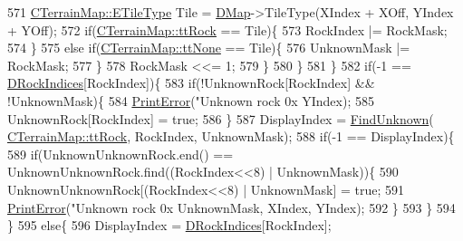 \begin{DoxyCode}
{{{{{{571                                 \hyperlink{classCTerrainMap_aff2ab991e237269941416dd79d8871d4}{CTerrainMap::ETileType} Tile = 
      \hyperlink{classCMapRenderer_ab9a199c61aa1c87a3248af3085d8ba52}{DMap}->TileType(XIndex + XOff, YIndex + YOff);
572                                 \textcolor{keywordflow}{if}(\hyperlink{classCTerrainMap_aff2ab991e237269941416dd79d8871d4a215740f194a2d72a21d47c848fbfecad}{CTerrainMap::ttRock} == Tile)\{
573                                     RockIndex |= RockMask;   
574                                 \}
575                                 \textcolor{keywordflow}{else} \textcolor{keywordflow}{if}(\hyperlink{classCTerrainMap_aff2ab991e237269941416dd79d8871d4a481e779132fb16414d17870bd6229eb5}{CTerrainMap::ttNone} == Tile)\{
576                                     UnknownMask |= RockMask;
577                                 \}
578                                 RockMask <<= 1;
579                             \}
580                         \}
581                     \}
582                     \textcolor{keywordflow}{if}(-1 == \hyperlink{classCMapRenderer_ac9178a9c9d30ac44aed7d324c51164a4}{DRockIndices}[RockIndex])\{
583                         \textcolor{keywordflow}{if}(!UnknownRock[RockIndex] && !UnknownMask)\{
584                             \hyperlink{Debug_8h_a2ed825eefefe35baf59a93a8c641323d}{PrintError}(\textcolor{stringliteral}{"Unknown rock 0x%
      YIndex);   
585                             UnknownRock[RockIndex] = \textcolor{keyword}{true};
586                         \}
587                         DisplayIndex = \hyperlink{classCMapRenderer_aec3c1d3294ac3af8ebb717ed5be88870}{FindUnknown}(
      \hyperlink{classCTerrainMap_aff2ab991e237269941416dd79d8871d4a215740f194a2d72a21d47c848fbfecad}{CTerrainMap::ttRock}, RockIndex, UnknownMask);
588                         \textcolor{keywordflow}{if}(-1 == DisplayIndex)\{
589                             \textcolor{keywordflow}{if}(UnknownUnknownRock.end() == UnknownUnknownRock.find((RockIndex<<8) | 
      UnknownMask))\{
590                                 UnknownUnknownRock[(RockIndex<<8) | UnknownMask] = \textcolor{keyword}{true};
591                                 \hyperlink{Debug_8h_a2ed825eefefe35baf59a93a8c641323d}{PrintError}(\textcolor{stringliteral}{"Unknown rock 0x%
      UnknownMask, XIndex, YIndex);   
592                             \}
593                         \}
594                     \}
595                     \textcolor{keywordflow}{else}\{
596                         DisplayIndex = \hyperlink{classCMapRenderer_ac9178a9c9d30ac44aed7d324c51164a4}{DRockIndices}[RockIndex];  
}}}}}}}}
\end{DoxyCode}

